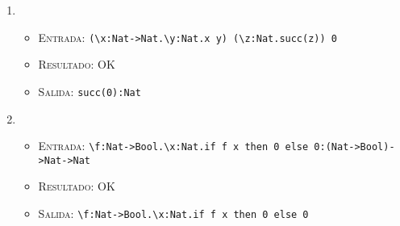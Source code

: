 \documentclass[11pt]{article}
\newcounter{savedenum}
\newcommand{\saveenum}{\setcounter{savedenum}{\theenumi}}
\begin{document}
\begin{enumerate}
\begin{itemize}
    \item \textsc{Salida:}    \verb|\f:Nat->Nat.\x:Nat.f x:(Nat->Nat)->Nat->Nat|
    \end{itemize}
\item \begin{itemize}
    \item \textsc{Entrada:}   \verb|(\x:Nat->Nat.\y:Nat.x y) (\z:Nat.succ(z)) 0|
    \item \textsc{Resultado:} OK
    \item \textsc{Salida:}    \verb|succ(0):Nat|
    \end{itemize}
\item \begin{itemize}
    \item \textsc{Entrada:}   \verb|\f:Nat->Bool.\x:Nat.if f x then 0 else 0:(Nat->Bool)->Nat->Nat|
    \item \textsc{Resultado:} OK
    \item \textsc{Salida:}    \verb|\f:Nat->Bool.\x:Nat.if f x then 0 else 0|
    \end{itemize}
\saveenum
\end{enumerate}
\end{document}
